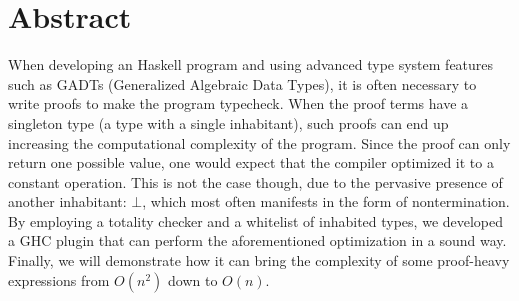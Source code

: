 \chapter*{Abstract}
\label{abstract}


When developing an Haskell program and using advanced type system features such as GADTs (Generalized Algebraic Data Types), it is often necessary to write proofs to make the program typecheck.
When the proof terms have a singleton type (a type with a single inhabitant), such proofs can end up increasing the computational complexity of the program.
Since the proof can only return one possible value, one would expect that the compiler optimized it to a constant operation.
This is not the case though, due to the pervasive presence of another inhabitant: $\bot$, which most often manifests in the form of nontermination.
By employing a totality checker and a whitelist of inhabited types, we developed a GHC plugin that can perform the aforementioned optimization in a sound way.
Finally, we will demonstrate how it can bring the complexity of some proof-heavy expressions from $O(n^2)$ down to $O(n)$.

